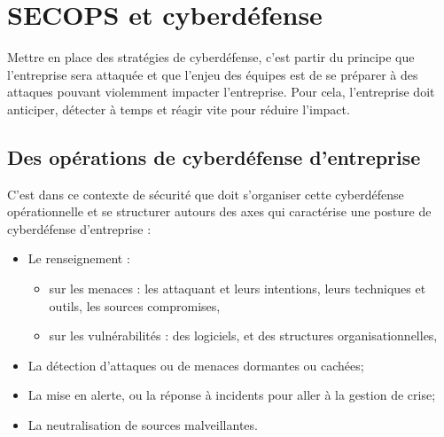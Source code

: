 %
%



\section{SECOPS et cyberdéfense}

Mettre en place des stratégies de cyberdéfense, c'est partir du principe que l'entreprise sera attaquée et que l'enjeu des équipes est de se préparer à des attaques pouvant violemment impacter l'entreprise. Pour cela, l'entreprise doit anticiper, détecter à temps et réagir vite pour réduire l'impact.

	\subsection{Des opérations de cyberdéfense d'entreprise}
	
C'est dans ce contexte de sécurité  que doit s'organiser cette cyberdéfense opérationnelle et se structurer autours des axes qui caractérise une posture de cyberdéfense d'entreprise : 
	
\begin{itemize}
  \item Le renseignement : 
  				\begin{itemize}
  					\item sur les menaces  : les attaquant et leurs intentions, leurs techniques et outils, les sources compromises,
  					\item sur les vulnérabilités : des logiciels, et des structures organisationnelles,
			\end{itemize}
  \item La détection d'attaques ou de menaces dormantes ou cachées;
  \item La mise en alerte, ou la réponse à incidents pour aller à la gestion de crise;
  \item La neutralisation de sources malveillantes.
\end{itemize}
	
